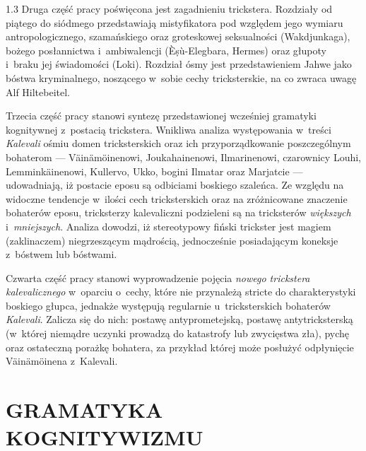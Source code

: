 \documentclass[11pt,a4paper,twoside]{report}
\begin{document}
\begin{spacing}{1.3}
Druga część pracy poświęcona jest zagadnieniu trickstera. Rozdziały od piątego do siódmego przedstawiają mistyfikatora pod względem jego wymiaru antropologicznego, szamańskiego oraz groteskowej seksualności (Wakdjunkaga), bożego posłannictwa i~ambiwalencji (\`{E}\d{s}\`{u}-Elegbara, Hermes) oraz głupoty i~braku jej świadomości (Loki). Rozdział ósmy jest przedstawieniem Jahwe jako bóstwa kryminalnego, noszącego w~sobie cechy tricksterskie, na co zwraca uwagę Alf Hiltebeitel.

Trzecia część pracy stanowi syntezę przedstawionej wcześniej gramatyki kognitywnej z~postacią trickstera. Wnikliwa analiza występowania w~treści \emph{Kalevali} ośmiu domen tricksterskich oraz ich przyporządkowanie poszczególnym bohaterom --- Väinämöinenowi, Joukahainenowi, Ilmarinenowi, czarownicy Louhi, Lemminkäinenowi, Kullervo, Ukko, bogini Ilmatar oraz Marjatcie --- udowadniają, iż postacie eposu są odbiciami boskiego szaleńca. Ze względu na widoczne tendencje w~ilości cech tricksterskich oraz na zróżnicowane znaczenie bohaterów eposu, tricksterzy kalevaliczni podzieleni są na tricksterów \emph{większych} i~\emph{mniejszych}. Analiza dowodzi, iż stereotypowy fiński trickster jest magiem (zaklinaczem) niegrzeszącym mądrością, jednocześnie posiadającym koneksje z~bóstwem lub bóstwami.

Czwarta część pracy stanowi wyprowadzenie pojęcia \emph{nowego trickstera kalevalicznego} w~oparciu o~cechy, które nie przynależą stricte do charakterystyki boskiego głupca, jednakże występują regularnie u~tricksterskich bohaterów \emph{Kalevali}. Zalicza się do nich: postawę antyprometejską, postawę antytricksterską (w~której niemądre uczynki prowadzą do katastrofy lub zwycięstwa zła), pychę oraz ostateczną porażkę bohatera, za przykład której może posłużyć odpłynięcie Väinämöinena z~Kalevali.

\end{spacing}

\part{GRAMATYKA KOGNITYWIZMU}
\clearpage{\pagestyle{empty}\cleardoublepage}
\end{document}
